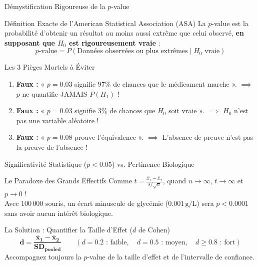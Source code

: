 \documentclass[aspectratio=169,10pt]{beamer}
\begin{document}
\begin{frame}{Démystification Rigoureuse de la $p$-value}
  \begin{conceptbox}{Définition Exacte de l'American Statistical Association (ASA)}
    La $p$-value est la probabilité d'obtenir un résultat au moins aussi extrême que celui observé, \textbf{en supposant que $H_0$ est rigoureusement vraie} :
    \begin{equation*}
      p\text{-value} = P(\text{Données observées ou plus extrêmes} \mid H_0 \text{ vraie})
    \end{equation*}
  \end{conceptbox}
  \vspace{1.5mm}
  \begin{warnbox}{Les 3 Pièges Mortels à Éviter}
    \begin{enumerate}\setlength{\itemsep}{1.5pt}
      \item \textbf{Faux :} « $p = 0.03$ signifie $97\%$ de chances que le médicament marche ». $\implies$ $p$ ne quantifie JAMAIS $P(H_1)$ !
      \item \textbf{Faux :} « $p = 0.03$ signifie $3\%$ de chances que $H_0$ soit vraie ». $\implies$ $H_0$ n'est pas une variable aléatoire !
      \item \textbf{Faux :} « $p = 0.08$ prouve l'équivalence ». $\implies$ L'absence de preuve n'est pas la preuve de l'absence !
    \end{enumerate}
  \end{warnbox}
\end{frame}

\begin{frame}{Significativité Statistique ($p < 0.05$) vs. Pertinence Biologique}
  \begin{conceptbox}{Le Paradoxe des Grands Effectifs}
    Comme $t = \frac{\bar{x}_1 - \bar{x}_2}{s / \sqrt{n}}$, quand $n \to \infty$, $t \to \infty$ et $p \to 0$ !\\
    Avec $100\,000$ souris, un écart minuscule de glycémie ($0.001\,\text{g/L}$) sera $p < 0.0001$ sans avoir aucun intérêt biologique.
  \end{conceptbox}
  \vspace{1.5mm}
  \begin{biobox}{La Solution : Quantifier la Taille d'Effet ($d$ de Cohen)}
    \begin{equation*}
      \mathbf{d = \frac{\bar{x}_1 - \bar{x}_2}{SD_{\text{pooled}}}} \qquad (d=0.2 \text{ : faible}, \quad d=0.5 \text{ : moyen}, \quad d \ge 0.8 \text{ : fort})
    \end{equation*}
    Accompagnez toujours la $p$-value de la taille d'effet et de l'intervalle de confiance.
  \end{biobox}
\end{frame}
\end{document}

